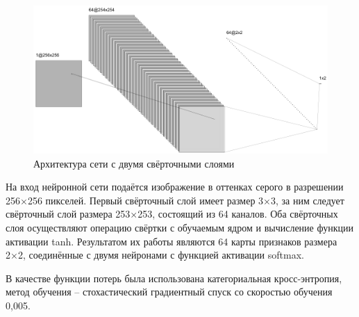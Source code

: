 \begin{figure}[!htb]
\centering
\includegraphics[width=1\textwidth]{include/graphics/im_4-french_cnn_architecture}
\caption{Архитектура сети с двумя свёрточными слоями}
\label{fig:FrenchCNNArchitecture}
\end{figure}

На вход нейронной сети подаётся изображение в оттенках серого в разрешении 256×256 пикселей. Первый свёрточный слой имеет размер 3×3, за ним следует свёрточный слой размера 253×253, состоящий из 64 каналов. Оба свёрточных слоя осуществляют операцию свёртки с обучаемым ядром и вычисление функции активации tanh. Результатом их работы являются 64 карты признаков размера 2×2, соединённые с двумя нейронами с функцией активации softmax.

В качестве функции потерь была использована категориальная кросс-энтропия, метод обучения – стохастический градиентный спуск со скоростью обучения 0,005.
\clearpage